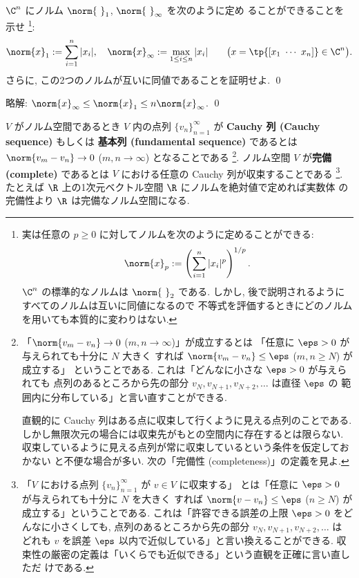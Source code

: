\documentclass[12pt,twoside]{jarticle}
\newcommand\commentout[1]{#1}
\newcommand\commentout[1]{}
\begin{document}
\begin{question}
\label{q:norm-1-infty}
  $\C^n$ にノルム $\norm{{\ }}_1$, $\norm{{\ }}_\infty$ を次のように定め
  ることができることを示せ%
  \footnote{実は任意の $p\ge 0$ に対してノルムを次のように定めることができる:
    \begin{equation*}
      \norm{x}_p := \left(\sum_{i=1}^n |x_i|^p \right)^{1/p}.
    \end{equation*}
    $\C^n$ の標準的なノルムは $\norm{{\ }}_2$ である.
    しかし, 後で説明されるようにすべてのノルムは互いに同値になるので
    不等式を評価するときにどのノルムを用いても本質的に変わりはない.}:
  \begin{equation*}
    \norm{x}_1 := \sum_{i=1}^n |x_i|,
    \quad
    \norm{x}_\infty := \max_{1\le i\le n}|x_i|
    \qquad
    \bigl(x=\tp{[x_1\ \cdots\ x_n]}\in\C^n\bigr).
  \end{equation*}
  さらに, この2つのノルムが互いに同値であることを証明せよ. \qed
\end{question}

\commentout{
\noindent
略解: $\norm{x}_\infty \le \norm{x}_1 \le n\norm{x}_\infty$. \qed
}

\bigskip

$V$ がノルム空間であるとき $V$ 内の点列 $\{v_n\}_{n=1}^\infty$ が 
{\bf Cauchy 列 (Cauchy sequence)} もしくは {\bf 基本列 (fundamental sequence)} 
であるとは $\norm{v_m-v_n}\to 0$ ($m,n\to\infty$) となることである%
\footnote{「$\norm{v_m-v_n}\to 0$ ($m,n\to\infty$)」が成立するとは
  「任意に $\eps>0$ が与えられても十分に $N$ 大きく
  すれば $\norm{v_m-v_n}\le\eps$ ($m,n\ge N$) が成立する」
  ということである.  これは「どんなに小さな $\eps>0$ が与えられても
  点列のあるところから先の部分 $v_N,v_{N+1},v_{N+2},\ldots$ は直径 $\eps$ の
  範囲内に分布している」と言い直すことができる.

  直観的に Cauchy 列はある点に収束して行くように見える点列のことである.
  しかし無限次元の場合には収束先がもとの空間内に存在するとは限らない.
  収束しているように見える点列が常に収束しているという条件を仮定しておかない
  と不便な場合が多い. 次の「完備性 (completeness)」の定義を見よ.}.
ノルム空間 $V$ が{\bf 完備 (complete)} であるとは $V$ における任意の Cauchy 
列が収束することである%
\footnote{「$V$ における点列 $\{v_n\}_{n=1}^\infty$ が $v\in V$ に収束する」
  とは「任意に $\eps>0$ が与えられても十分に $N$ を大きく
  すれば $\norm{v-v_n}\le\eps$ ($n\ge N$) が成立する」ということである.
  これは「許容できる誤差の上限 $\eps>0$ をどんなに小さくしても, 
  点列のあるところから先の部分 $v_N,v_{N+1},v_{N+2},\ldots$ は
  どれも $v$ を誤差 $\eps$ 以内で近似している」と言い換えることができる.
  収束性の厳密の定義は「いくらでも近似できる」という直観を正確に言い直しただ
  けである.}.
たとえば $\R$ 上の1次元ベクトル空間 $\R$ にノルムを絶対値で定めれば実数体
の完備性より $\R$ は完備なノルム空間になる.
\end{document}
